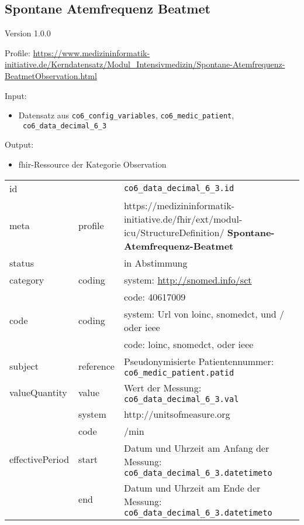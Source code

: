 \subsection{Spontane Atemfrequenz Beatmet} 
\noindent Version 1.0.0

\noindent Profile: \url{https://www.medizininformatik-initiative.de/Kerndatensatz/Modul_Intensivmedizin/Spontane-Atemfrequenz-BeatmetObservation.html}

\noindent Input:
\begin{itemize}
	\item Datensatz aus \texttt{co6\_config\_variables}, \texttt{co6\_medic\_patient}, \\ \texttt{
co6\_data\_decimal\_6\_3}
\end{itemize}
Output:
\begin{itemize}
        \item \ac{fhir}-Ressource der Kategorie \glqq Observation\grqq{}
\end{itemize}
\begin{longtable}{|l|l|p{7.5cm}|}
        \hline
        \rowcolor{lightgray} \multicolumn{3}{|l|}{Data Mapping (inhaltlich)} \\ \hline
        id &  & \texttt{co6\_data\_decimal\_6\_3.id} \\ \hline
	meta & profile & https://medizininformatik-initiative.de/fhir/ext/modul-icu/StructureDefinition/\textbf{
Spontane-Atemfrequenz-Beatmet} \\ \hline 
	status &  & in Abstimmung  \\ \hline 
	category & coding & system: \url{http://snomed.info/sct} \\
\cline{3-3}
	& & code: 40617009 \\ \hline
	code & coding & system: Url von \ac{loinc}, \ac{snomedct}, und / oder \ac{ieee} \\ 
	\cline{3-3} 
	 &  & code: \ac{loinc}, \ac{snomedct}, oder \ac{ieee} \\ \hline
	subject & reference & Pseudonymisierte Patientennummer: \texttt{co6\_medic\_patient.patid} \\ \hline
	valueQuantity & value & Wert der Messung: \texttt{
co6\_data\_decimal\_6\_3.val} \\
        \cline{2-3}
         & system & http://unitsofmeasure.org \\
         \cline{2-3}
         & code & /min \\ \hline
    effectivePeriod & start & Datum und Uhrzeit am Anfang der Messung: \texttt{
co6\_data\_decimal\_6\_3.datetimeto} \\
    \cline{2-3}
     & end & Datum und Uhrzeit am Ende der Messung: \texttt{
co6\_data\_decimal\_6\_3.datetimeto} \\ \hline
\end{longtable}



